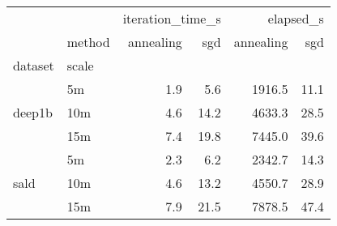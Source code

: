 \begin{tabular}{llrrrr}
\toprule
 &  & \multicolumn{2}{r}{iteration_time_s} & \multicolumn{2}{r}{elapsed_s} \\
 & method & annealing & sgd & annealing & sgd \\
dataset & scale &  &  &  &  \\
\midrule
\multirow[t]{3}{*}{deep1b} & 5m & 1.9 & 5.6 & 1916.5 & 11.1 \\
 & 10m & 4.6 & 14.2 & 4633.3 & 28.5 \\
 & 15m & 7.4 & 19.8 & 7445.0 & 39.6 \\
\cline{1-6}
\multirow[t]{3}{*}{sald} & 5m & 2.3 & 6.2 & 2342.7 & 14.3 \\
 & 10m & 4.6 & 13.2 & 4550.7 & 28.9 \\
 & 15m & 7.9 & 21.5 & 7878.5 & 47.4 \\
\cline{1-6}
\bottomrule
\end{tabular}
